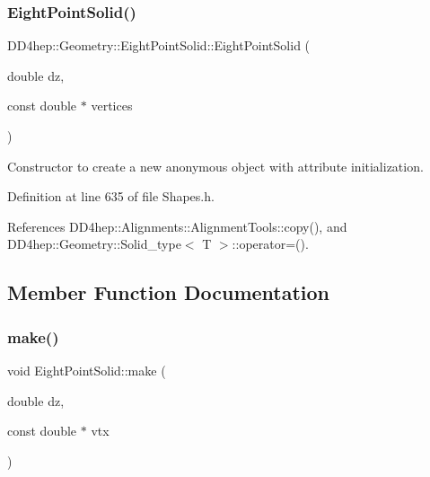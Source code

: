 \hypertarget{class_d_d4hep_1_1_geometry_1_1_eight_point_solid_a31cadc86111d6b1cfcd6767c33c64f73}{}\label{class_d_d4hep_1_1_geometry_1_1_eight_point_solid_a31cadc86111d6b1cfcd6767c33c64f73} 
\subsubsection{\texorpdfstring{Eight\+Point\+Solid()}{EightPointSolid()}\hspace{0.1cm}{\footnotesize\ttfamily [5/5]}}
{\footnotesize\ttfamily D\+D4hep\+::\+Geometry\+::\+Eight\+Point\+Solid\+::\+Eight\+Point\+Solid (\begin{DoxyParamCaption}\item[{double}]{dz,  }\item[{const double $\ast$}]{vertices }\end{DoxyParamCaption})\hspace{0.3cm}{\ttfamily [inline]}}



Constructor to create a new anonymous object with attribute initialization. 



Definition at line 635 of file Shapes.\+h.



References D\+D4hep\+::\+Alignments\+::\+Alignment\+Tools\+::copy(), and D\+D4hep\+::\+Geometry\+::\+Solid\+\_\+type$<$ T $>$\+::operator=().



\subsection{Member Function Documentation}
\hypertarget{class_d_d4hep_1_1_geometry_1_1_eight_point_solid_a037a713544e344700d7f3bd2e29406bb}{}\label{class_d_d4hep_1_1_geometry_1_1_eight_point_solid_a037a713544e344700d7f3bd2e29406bb} 
\subsubsection{\texorpdfstring{make()}{make()}}
{\footnotesize\ttfamily void Eight\+Point\+Solid\+::make (\begin{DoxyParamCaption}\item[{double}]{dz,  }\item[{const double $\ast$}]{vtx }\end{DoxyParamCaption})\hspace{0.3cm}{\ttfamily [private]}}



